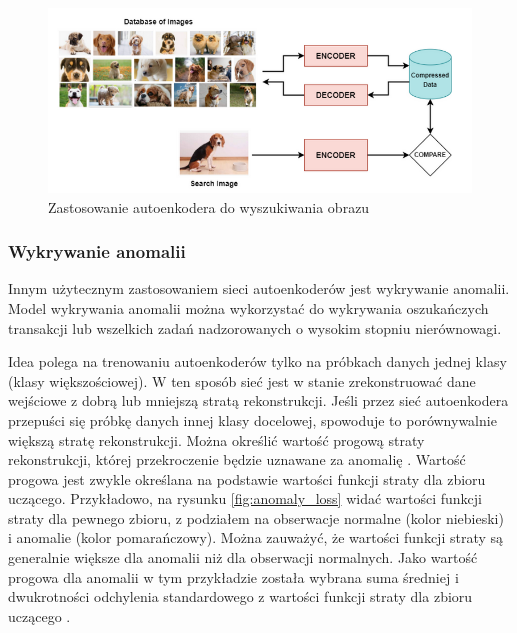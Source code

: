 \documentclass[12pt]{mwbk}
\theoremstyle{plain}
\theoremstyle{definition}
\theoremstyle{remark}
\newcommand\zrodlo[1]{\par\vspace{-3mm}{\small\textit{Źródło: }#1 }}
\begin{document}
\begin{figure}[!h]
	\centering
	\includegraphics[width=\linewidth]{rys/image_search.png}
	\caption{Zastosowanie autoenkodera do wyszukiwania obrazu}
	\zrodlo{\cite{kumar}}
	\label{fig:image-search}
\end{figure}

\newpage

\subsubsection{Wykrywanie anomalii}

Innym użytecznym zastosowaniem sieci autoenkoderów jest wykrywanie anomalii. Model wykrywania anomalii można wykorzystać do wykrywania oszukańczych transakcji lub wszelkich zadań nadzorowanych o wysokim stopniu nierównowagi.

 Idea polega na trenowaniu autoenkoderów tylko na próbkach danych jednej klasy (klasy większościowej). W ten sposób sieć jest w stanie zrekonstruować dane wejściowe z dobrą lub mniejszą stratą rekonstrukcji. Jeśli przez sieć autoenkodera przepuści się próbkę danych innej klasy docelowej, spowoduje to porównywalnie większą stratę rekonstrukcji. Można określić wartość progową straty rekonstrukcji, której przekroczenie będzie uznawane za anomalię \cite{kumar}. Wartość progowa jest zwykle określana na podstawie wartości funkcji straty dla zbioru uczącego. Przykładowo, na rysunku \ref{fig:anomaly_loss} widać wartości funkcji straty dla pewnego zbioru, z podziałem na obserwacje normalne (kolor niebieski) i anomalie (kolor pomarańczowy). Można zauważyć, że wartości funkcji straty są generalnie większe dla anomalii niż dla obserwacji normalnych. Jako wartość progowa dla anomalii w tym przykładzie została wybrana suma średniej i dwukrotności odchylenia standardowego z wartości funkcji straty dla zbioru uczącego \cite{agrawal}.
 
\end{document}
